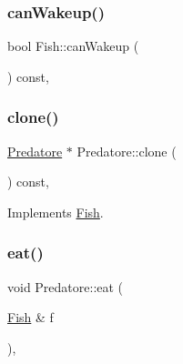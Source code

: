 \mbox{\label{classFish_a033298bf0dc885b82dbd195fc4997643_a033298bf0dc885b82dbd195fc4997643}} 
\subsubsection{\texorpdfstring{can\+Wakeup()}{canWakeup()}}
{\footnotesize\ttfamily bool Fish\+::can\+Wakeup (\begin{DoxyParamCaption}{ }\end{DoxyParamCaption}) const\hspace{0.3cm}{\ttfamily [virtual]}, {\ttfamily [inherited]}}

\mbox{\label{classPredatore_a493b41e7df1542c10cdd646559514917_a493b41e7df1542c10cdd646559514917}} 
\subsubsection{\texorpdfstring{clone()}{clone()}}
{\footnotesize\ttfamily \hyperlink{classPredatore}{Predatore} $\ast$ Predatore\+::clone (\begin{DoxyParamCaption}{ }\end{DoxyParamCaption}) const\hspace{0.3cm}{\ttfamily [override]}, {\ttfamily [virtual]}}



Implements \hyperlink{classFish_a6732945f7373a28b1723e55de8a65e13_a6732945f7373a28b1723e55de8a65e13}{Fish}.

\mbox{\label{classPredatore_a67da3e1eb33a3e27014acc9195d72d08_a67da3e1eb33a3e27014acc9195d72d08}} 
\subsubsection{\texorpdfstring{eat()}{eat()}}
{\footnotesize\ttfamily void Predatore\+::eat (\begin{DoxyParamCaption}\item[{\hyperlink{classFish}{Fish} \&}]{f }\end{DoxyParamCaption})\hspace{0.3cm}{\ttfamily [override]}, {\ttfamily [virtual]}}



